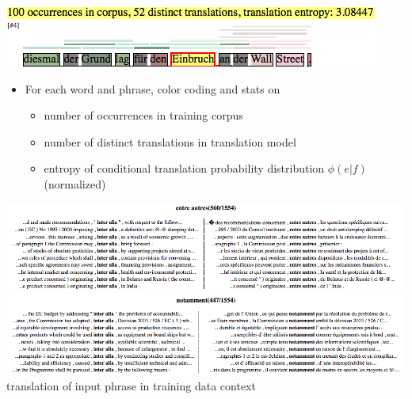 \documentclass[landscape]{uedslides2C}
\begin{document}

\vspace{10mm}
\begin{center}
\includegraphics[scale=1.5]{analysis-coverage.png}\\[20mm]
\end{center}
\begin{itemize}
\item For each word and phrase, color coding and stats on
\begin{itemize}
\item number of occurrences in training corpus
\item number of distinct translations in translation model
\item entropy of conditional translation probability distribution $\phi(e|f)$ (normalized)
\end{itemize}
\end{itemize}


\vspace{-5mm}
\begin{center}
\includegraphics[scale=0.75]{biconcor1.png}\\[5mm]
\includegraphics[scale=0.75]{biconcor2.png}\\
translation of input phrase in training data context
\end{center}

\end{document}
